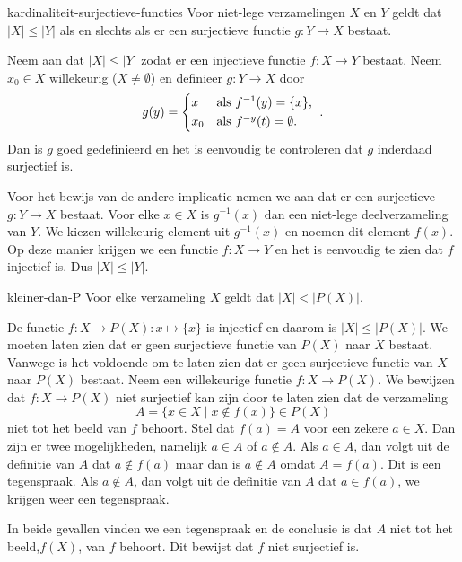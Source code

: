 \begin{lemma}{}{kardinaliteit-surjectieve-functies}
    Voor niet-lege verzamelingen $X$ en $Y$ geldt dat $\lvert X\rvert \leq \lvert Y\rvert$ als en slechts als er een surjectieve functie $g: Y \to X$ bestaat.
\end{lemma}
\begin{bewijs}{}{}
    Neem aan dat $\lvert X\rvert \leq \lvert Y\rvert$ zodat er een injectieve functie $f: X \to Y$ bestaat.
    Neem $x_0 \in X$ willekeurig ($X \neq \emptyset$) en definieer $g: Y \to X$ door
    \[
        g(y) =
        \begin{cases*}
            x & als $f^{-1} (y)=\{x\}$, \\
            x_0 & als $f^{-y}(t)=\emptyset$.
        \end{cases*}.
    \]
    Dan is $g$ goed gedefinieerd en het is eenvoudig te controleren dat $g$ inderdaad surjectief is.

    Voor het bewijs van de andere implicatie nemen we aan dat er een surjectieve $g: Y \to X$ bestaat.
    Voor elke $x \in X$ is $g^{-1}(x)$ dan een niet-lege deelverzameling van $Y$.
    We kiezen willekeurig element uit $g^{-1}(x)$ en noemen dit element $f(x)$.
    Op deze manier krijgen we een functie $f: X \to Y$ en het is eenvoudig te zien dat $f$ injectief is.
    Dus $\lvert X\rvert \leq \lvert Y\rvert$.
\end{bewijs}

\begin{stelling}{}{kleiner-dan-P}
    Voor elke verzameling $X$ geldt dat $\lvert X\rvert < \lvert P(X)\rvert$.
\end{stelling}
\begin{bewijs}{}{}
    De functie $f: X \to P(X): x \mapsto \{x\}$ is injectief en daarom is $\lvert X\rvert \leq \lvert P(X)\rvert$.
    We moeten laten zien dat er geen surjectieve functie van $P(X)$ naar $X$ bestaat.
    Vanwege  is het voldoende om te laten zien dat er geen surjectieve functie van $X$ naar $P(X)$ bestaat.
    Neem een willekeurige functie $f: X \to P(X)$.
    We bewijzen dat $f: X \to P(X)$ niet surjectief kan zijn door te laten zien dat de verzameling
    \[
        A = \{x \in X \mid x \notin f(x)\} \in P(X)
    \] niet tot het beeld van $f$ behoort.
    Stel dat $f(a) = A$ voor een zekere $a \in X$.
    Dan zijn er twee mogelijkheden, namelijk $a \in A$ of $a \notin A$.
    Als $a \in A$, dan volgt uit de definitie van $A$ dat $a \notin f(a)$ maar dan is $a \notin A$ omdat $A = f(a)$.
    Dit is een tegenspraak.
    Als $a \notin A$, dan volgt uit de definitie van $A$ dat $a \in f(a)$, we krijgen weer een tegenspraak. 

    In beide gevallen vinden we een tegenspraak en de conclusie is dat $A$ niet tot het beeld,$f(X)$, van $f$ behoort.
    Dit bewijst dat $f$ niet surjectief is.
\end{bewijs}


